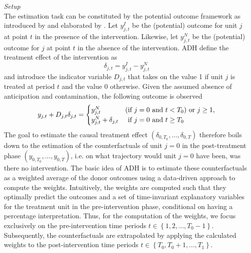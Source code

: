\textit{Setup} \\
The estimation task can be constituted by the potential outcome framework as introduced by \cite{neyman:1923} and elaborated by \cite{rubin:1974}. Let $y^{I}_{j,t}$ be the (potential) outcome for unit $j$ at point $t$ in the presence of the intervention. Likewise, let $y^{N}_{j,t}$ be the (potential) outcome for $j$ at point $t$ in the absence of the intervention. \ac{ADH} define the treatment effect of the intervention as 
\[
\delta_{j,t} = y^{I}_{j,t} - y^{N}_{j,t}
\] 
and introduce the indicator variable $D_{j,t}$ that takes on the value 1 if unit $j$ is treated at period $t$ and the value 0 otherwise. Given the assumed absence of anticipation and contamination, the following outcome is observed
\[
y_{j,t} + D_{j,t} \delta_{j,t} = 
\begin{cases}
	y^{N}_{j,t} &\text{(if } j = 0 \text{ and } t < T_0\text{)} \text{ or } j \geq 1, \\
	y^{N}_{j,t} + \delta_{j,t} &  \text{\phantom{(}if } j = 0 \text{ and } t \geq T_0
\end{cases}
\] 
The goal to estimate the causal treatment effect $(\delta_{0,T_0}, ..., \delta_{0,T})$ therefore boils down to the estimation of the counterfactuals of unit $j = 0$ in the post-treatment phase $(y_{0,T_0}, ..., y_{0,T})$, i.e. on what trajectory would unit $j=0$ have been, was there no intervention. The basic idea of \ac{ADH} is to estimate these counterfactuals as a weighted average of the donor outcomes using a data-driven approach to compute the weights. 
Intuitively, the weights are computed such that they optimally predict the outcomes and a set of time-invariant explanatory variables for the treatment unit in the pre-intervention phase, conditional on having a percentage interpretation. Thus, for the computation of the weights, we focus exclusively on the pre-intervention time periods $t \in \left\lbrace 1,2, ..., T_{0}-1\right\rbrace $. Subsequently, the counterfactuals are extrapolated by applying the calculated weights to the post-intervention time periods $t \in \left\lbrace T_{0},T_{0}+1, ..., T_{1}\right\rbrace $.


